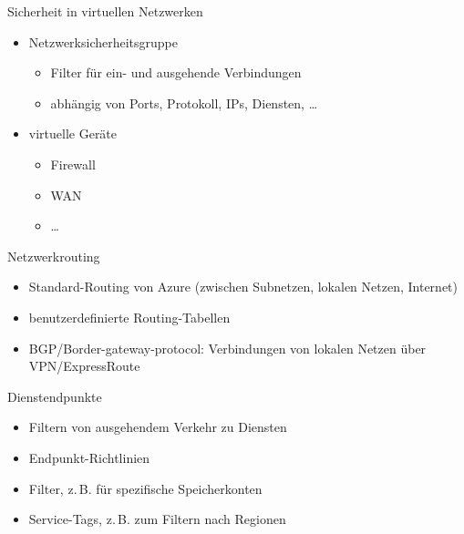 \begin{flashcard}[]{Sicherheit in virtuellen Netzwerken}
  \begin{itemize}
    \item Netzwerksicherheitsgruppe
      \begin{itemize}
        \item Filter für ein- und ausgehende Verbindungen
        \item abhängig von Ports, Protokoll, IPs, Diensten, \ldots
      \end{itemize}
    \item virtuelle Geräte
      \begin{itemize}
        \item Firewall
        \item WAN
        \item \ldots
      \end{itemize}
  \end{itemize}
\end{flashcard}

\begin{flashcard}[]{Netzwerkrouting}
  \begin{itemize}
    \item Standard-Routing von Azure (zwischen Subnetzen, lokalen Netzen, Internet)
    \item benutzerdefinierte Routing-Tabellen
    \item BGP/Border-gateway-protocol: Verbindungen von lokalen Netzen über VPN/ExpressRoute
  \end{itemize}
\end{flashcard}

\begin{flashcard}[]{Dienstendpunkte}
  \begin{itemize}
    \item Filtern von ausgehendem Verkehr zu Diensten
    \item Endpunkt-Richtlinien
    \item Filter, z.\,B. für spezifische Speicherkonten
    \item Service-Tags, z.\,B. zum Filtern nach Regionen
  \end{itemize}
\end{flashcard}

